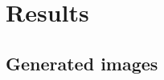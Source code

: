 \documentclass[twocolumn]{article}
\numberwithin{equation}{section}
\begin{document}

\section{Results}\label{sec:results}


\subsection{Generated images}




\end{document}
